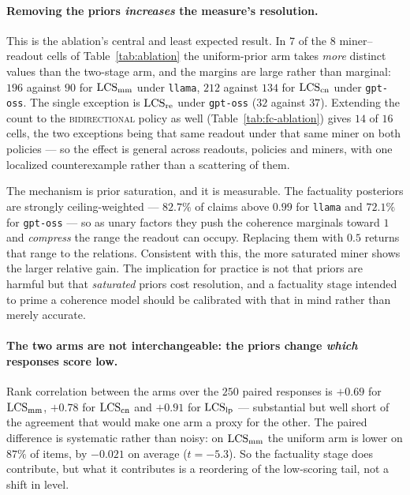 \paragraph{Removing the priors \emph{increases} the measure's resolution.} This is the ablation's
central and least expected result. In $7$ of the $8$ miner--readout cells of
Table~\ref{tab:ablation} the uniform-prior arm takes \emph{more} distinct values than the two-stage
arm, and the margins are large rather than marginal: $196$ against $90$ for $\mathrm{LCS}_{\mathrm{mm}}$ under
\texttt{llama}, $212$ against $134$ for $\mathrm{LCS}_{\mathrm{cn}}$ under \texttt{gpt-oss}. The single exception is
$\mathrm{LCS}_{\mathrm{re}}$ under \texttt{gpt-oss} ($32$ against $37$). Extending the count to the
\textsc{bidirectional} policy as well (Table~\ref{tab:fc-ablation}) gives $14$ of $16$ cells, the two
exceptions being that same readout under that same miner on both policies --- so the effect is general
across readouts, policies and miners, with one localized counterexample rather than a scattering of
them.

The mechanism is prior saturation, and it is measurable. The factuality posteriors are strongly
ceiling-weighted --- $82.7\%$ of claims above $0.99$ for \texttt{llama} and $72.1\%$ for
\texttt{gpt-oss} --- so as unary factors they push the coherence marginals toward $1$ and
\emph{compress} the range the readout can occupy. Replacing them with $0.5$ returns that range to the
relations. Consistent with this, the more saturated miner shows the larger relative gain. The
implication for practice is not that priors are harmful but that \emph{saturated} priors cost
resolution, and a factuality stage intended to prime a coherence model should be calibrated with that
in mind rather than merely accurate.

\paragraph{The two arms are not interchangeable: the priors change \emph{which} responses score low.}
Rank correlation between the arms over the $250$ paired responses is $+0.69$ for $\mathrm{LCS}_{\mathrm{mm}}$,
$+0.78$ for $\mathrm{LCS}_{\mathrm{cn}}$ and $+0.91$ for $\mathrm{LCS}_{\mathrm{lp}}$ --- substantial but well short of the
agreement that would make one arm a proxy for the other. The paired difference is systematic rather
than noisy: on $\mathrm{LCS}_{\mathrm{mm}}$ the uniform arm is lower on $87\%$ of items, by $-0.021$ on average
($t = -5.3$). So the factuality stage does contribute, but what it contributes is a reordering of the
low-scoring tail, not a shift in level.

